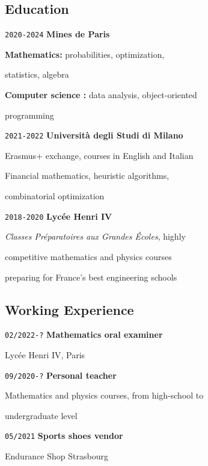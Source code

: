 \documentclass{article}
\begin{document}
\setlength{\columnsep}{2cm}
\setlength{\columnseprule}{1.5pt}
\begin{multicols}{2}
	{\color{blue} \subsection*{Education}}

		\noindent\texttt{2020-2024} \textbf{Mines de Paris}

		\textbf{Mathematics: } probabilities, optimization,

		statistics, algebra

		\textbf{Computer science : } data analysis, object-oriented

		programming

\hfill

		\noindent\texttt{2021-2022} \textbf{Università degli Studi di Milano}

		Erasmus+ exchange, courses in English and Italian

		Financial mathematics, heuristic algorithms,

		combinatorial optimization

\hfill

		\noindent\texttt{2018-2020} \textbf{Lycée Henri IV}
		
		\textit{Classes Préparatoires aux Grandes Écoles}, highly 

		competitive mathematics and physics courses 

		preparing for France's best engineering schools

\hfill

	{\color{blue} \subsection*{Working Experience}}

		\noindent\texttt{02/2022-?} \textbf{Mathematics oral examiner}

		Lycée Henri IV, Paris


		\noindent\texttt{09/2020-?} \textbf{Personal teacher}

		Mathematics and physics courses, from high-school to 

		undergraduate level

\hfill
	
		\noindent\texttt{05/2021} \textbf{Sports shoes vendor}

		Endurance Shop Strasbourg

\hfill


\end{multicols}
\end{document}
